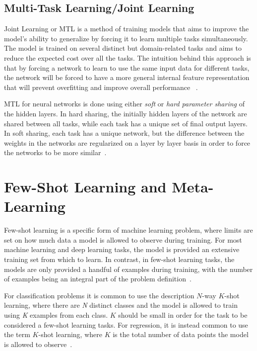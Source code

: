 \subsection{Multi-Task Learning/Joint Learning}\label{MTL}
Joint Learning or \gls{MTL} is a method of training models that aims to improve the model's ability to generalize by forcing it to learn multiple tasks simultaneously. The model is trained on several distinct but domain-related tasks and aims to reduce the expected cost over all the tasks. The intuition behind this approach is that by forcing a network to learn to use the same input data for different tasks, the network will be forced to have a more general internal feature representation that will prevent overfitting and improve overall performance ~\cite{multi-task-learning}. 

\gls{MTL} for neural networks is done using either \textit{soft} or \textit{hard parameter sharing} of the hidden layers. In hard sharing, the initially hidden layers of the network are shared between all tasks, while each task has a unique set of final output layers. In soft sharing, each task has a unique network, but the difference between the weights in the networks are regularized on a layer by layer basis in order to force the networks to be more similar~\cite{multi-task-learning}.

\section{Few-Shot Learning and Meta-Learning}\label{metalearning}
Few-shot learning is a specific form of machine learning problem, where limits are set on how much data a model is allowed to observe during training. For most machine learning and deep learning tasks, the model is provided an extensive training set from which to learn. In contrast, in few-shot learning tasks, the models are only provided a handful of examples during training, with the number of examples being an integral part of the problem definition~\cite{maml}. 

For classification problems it is common to use the description $N$-way $K$-shot learning, where there are \textit{N} distinct classes and the model is allowed to train using \textit{K} examples from each class. $K$ should be small in order for the task to be considered a few-shot learning tasks. For regression, it is instead common to use the term $K$-shot learning, where $K$ is the total number of data points the model is allowed to observe~\cite{maml}.


